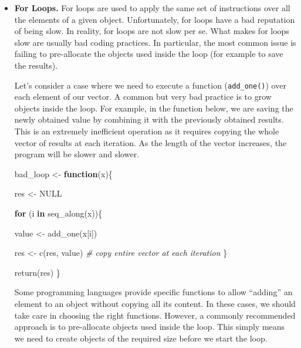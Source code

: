 \documentclass[
  11pt,
]{book}
\newenvironment{Shaded}{\begin{snugshade}}{\end{snugshade}}
\newcommand{\CommentTok}[1]{\textcolor[rgb]{0.56,0.35,0.01}{\textit{#1}}}
\newcommand{\ConstantTok}[1]{\textcolor[rgb]{0.00,0.00,0.00}{#1}}
\newcommand{\ControlFlowTok}[1]{\textcolor[rgb]{0.13,0.29,0.53}{\textbf{#1}}}
\newcommand{\FunctionTok}[1]{\textcolor[rgb]{0.00,0.00,0.00}{#1}}
\newcommand{\NormalTok}[1]{#1}
\newcommand{\OtherTok}[1]{\textcolor[rgb]{0.56,0.35,0.01}{#1}}
\newenvironment{code-tex-bad}
  {\begingroup\definecolor{shadecolor}{RGB}{255, 189, 185}}
  {\endgroup}
\begin{document}
\begin{itemize}
\item
  \textbf{For Loops.} For loops are used to apply the same set of instructions over all the elements of a given object. Unfortunately, for loops have a bad reputation of being slow. In reality, for loops are not slow per se. What makes for loops slow are usually bad coding practices. In particular, the most common issue is failing to pre-allocate the objects used inside the loop (for example to save the results).

  Let's consider a case where we need to execute a function (\texttt{add\_one()}) over each element of our vector. A common but very bad practice is to grow objects inside the loop. For example, in the function below, we are saving the newly obtained value by combining it with the previously obtained results. This is an extremely inefficient operation as it requires copying the whole vector of results at each iteration. As the length of the vector increases, the program will be slower and slower.

  \begin{code-tex-bad}

\begin{Shaded}
\begin{Highlighting}[]
\NormalTok{bad\_loop }\OtherTok{\textless{}{-}} \ControlFlowTok{function}\NormalTok{(x)\{}

\NormalTok{  res }\OtherTok{\textless{}{-}} \ConstantTok{NULL}

  \ControlFlowTok{for}\NormalTok{ (i }\ControlFlowTok{in} \FunctionTok{seq\_along}\NormalTok{(x))\{}

\NormalTok{    value }\OtherTok{\textless{}{-}} \FunctionTok{add\_one}\NormalTok{(x[i])}

\NormalTok{    res }\OtherTok{\textless{}{-}} \FunctionTok{c}\NormalTok{(res, value) }\CommentTok{\# copy entire vector at each iteration}
\NormalTok{  \}}

  \FunctionTok{return}\NormalTok{(res)}
\NormalTok{\}}
\end{Highlighting}
\end{Shaded}

  \end{code-tex-bad}

  Some programming languages provide specific functions to allow ``adding'' an element to an object without copying all its content. In these cases, we should take care in choosing the right functions. However, a commonly recommended approach is to pre-allocate objects used inside the loop. This simply means we need to create objects of the required size before we start the loop.


\end{itemize}
\end{document}
